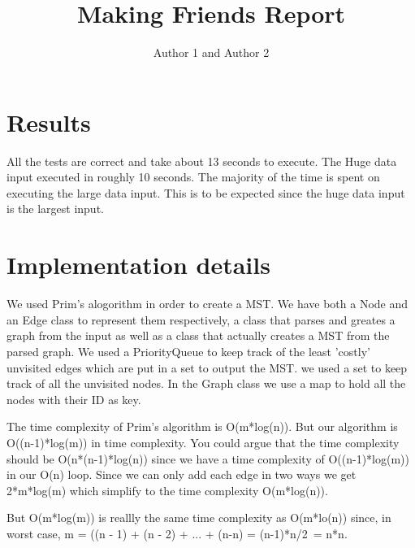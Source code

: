 \documentclass{article}
\title{Making Friends Report}
\author{Author 1 and Author 2}
\begin{document}
  \maketitle

  \section{Results}

  
  \par
  All the tests are correct and take about 13 seconds to execute. The Huge data input executed in roughly 10 seconds. The majority of the time is spent on executing the large data input. This is to be expected since the huge data input is the largest input.

  \section{Implementation details}

  
  \par
  We used Prim's alogorithm in order to create a MST. We have both a Node and  an Edge class to represent them respectively, a class that parses and greates a graph from the input as well as a class that actually creates a MST from the parsed graph. We used a PriorityQueue to keep track of the least 'costly' unvisited edges which are put in a set to output the MST. we used a set to keep track of all the unvisited nodes. In the Graph class we use a map to hold all the nodes with their ID as key.
  
  \par  
  The time complexity of Prim's algorithm is O(m*log(n)). But our algorithm is O((n-1)*log(m)) in time complexity. You could argue that the time complexity should be O(n*(n-1)*log(n)) since we have a time complexity of O((n-1)*log(m)) in our O(n) loop. Since we can only  add each edge in two ways we get 2*m*log(m) which simplify to the time complexity O(m*log(n)).
  
  \par But O(m*log(m)) is reallly the same time complexity as O(m*lo(n)) since, in worst case, m = ((n - 1) + (n - 2) + ... + (n-n) = (n-1)*n/2~= n*n.
\end{document}
